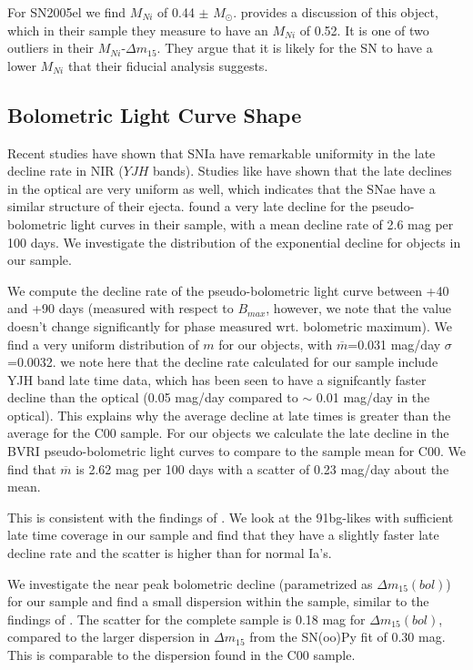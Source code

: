 For SN2005el we find $M_{Ni}$ of 0.44 $\pm$ $M_{\odot}$. \citet{Scalzo2014} provides a discussion of this object, which in their sample they measure to have an $M_{Ni}$ of 0.52. It is one of two outliers in their $M_{Ni}$-$\Delta m_{15}$. They argue that it is likely for the SN to have a lower $M_{Ni}$ that their fiducial analysis suggests.  





\subsection{Bolometric Light Curve Shape}
Recent studies have shown that SNIa have remarkable uniformity in the late decline rate in NIR ($YJH$ bands). Studies like \citep{Barbon1973, Phillips1999, Leibundgut2000}
have shown that the late declines in the optical are very uniform as well, which indicates that the SNae have a similar structure of their ejecta. \citet{Contardo2000}
found a very late decline for the pseudo-bolometric light curves in their sample, with a mean decline rate of 2.6 mag per 100 days. We investigate the distribution of the exponential 
decline for objects in our sample.

We compute the decline rate of the pseudo-bolometric light curve between +40 and +90 days (measured with respect to $B_{max}$, however, we note that the value doesn't change significantly for phase
measured wrt. bolometric maximum). We find a very uniform distribution of $m$ for our objects, with $\overline{m}$=0.031 mag/day $\sigma$=0.0032. we note here that the decline rate calculated for our sample include YJH band late time data, which has been seen to have a signifcantly faster decline than the optical (0.05 mag/day compared to $\sim$ 0.01 mag/day in the optical). This explains why the average decline at late times is greater than the average for the C00 sample. 
For our objects we calculate the late decline in the BVRI pseudo-bolometric light curves to compare to the sample mean for C00. We find that $\overline{m}$ is 2.62 mag per 100 days with a scatter of 0.23 mag/day about the mean.   

This is consistent with the findings of \citet{Contardo2000}.
We look at the 91bg-likes with sufficient late time coverage in our sample and find that they have a slightly faster late decline rate and the scatter is higher than for normal Ia's. 


We investigate the near peak bolometric decline (parametrized as $\Delta m_{15}(bol)$) for our sample and find a small dispersion within the sample, similar to the findings of \citet{Contardo2000}.
The scatter for the complete sample is 0.18 mag for $\Delta m_{15}(bol)$, compared to the larger dispersion in $\Delta m_{15}$ from the SN(oo)Py fit of 0.30 mag. This is comparable to the dispersion found in the C00 sample.

